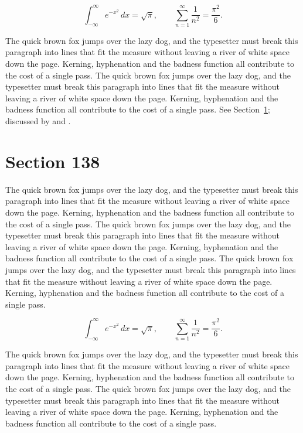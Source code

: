 \documentclass{article}
\begin{document}
\begin{equation}\label{eq:137}
\int_{-\infty}^{\infty} e^{-x^{2}}\,dx = \sqrt{\pi}, \qquad
\sum_{n=1}^{\infty} \frac{1}{n^{2}} = \frac{\pi^{2}}{6}.
\end{equation}

The quick brown fox jumps over the lazy dog, and the typesetter must break this paragraph into lines that fit the measure without leaving a river of white space down the page. Kerning, hyphenation and the badness function all contribute to the cost of a single pass. The quick brown fox jumps over the lazy dog, and the typesetter must break this paragraph into lines that fit the measure without leaving a river of white space down the page. Kerning, hyphenation and the badness function all contribute to the cost of a single pass. 
See Section~\ref{sec:138}; discussed by \textcite{k3} and \textcite{l5}.
\section{Section 138}
\label{sec:138}
The quick brown fox jumps over the lazy dog, and the typesetter must break this paragraph into lines that fit the measure without leaving a river of white space down the page. Kerning, hyphenation and the badness function all contribute to the cost of a single pass. The quick brown fox jumps over the lazy dog, and the typesetter must break this paragraph into lines that fit the measure without leaving a river of white space down the page. Kerning, hyphenation and the badness function all contribute to the cost of a single pass. The quick brown fox jumps over the lazy dog, and the typesetter must break this paragraph into lines that fit the measure without leaving a river of white space down the page. Kerning, hyphenation and the badness function all contribute to the cost of a single pass. 

\begin{equation}\label{eq:138}
\int_{-\infty}^{\infty} e^{-x^{2}}\,dx = \sqrt{\pi}, \qquad
\sum_{n=1}^{\infty} \frac{1}{n^{2}} = \frac{\pi^{2}}{6}.
\end{equation}

The quick brown fox jumps over the lazy dog, and the typesetter must break this paragraph into lines that fit the measure without leaving a river of white space down the page. Kerning, hyphenation and the badness function all contribute to the cost of a single pass. The quick brown fox jumps over the lazy dog, and the typesetter must break this paragraph into lines that fit the measure without leaving a river of white space down the page. Kerning, hyphenation and the badness function all contribute to the cost of a single pass. 
\end{document}

